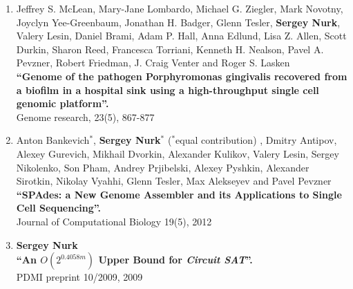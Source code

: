 \begin{enumerate}
\item Jeffrey S. McLean, Mary-Jane Lombardo, Michael G. Ziegler, Mark Novotny, Joyclyn Yee-Greenbaum, Jonathan H. Badger, Glenn Tesler, \textbf{Sergey Nurk}, Valery Lesin, Daniel Brami, Adam P. Hall, Anna Edlund, Lisa Z. Allen, Scott Durkin, Sharon Reed, Francesca Torriani, Kenneth H. Nealson, Pavel A. Pevzner, Robert Friedman, J. Craig Venter and Roger S. Lasken \\
\textbf{``Genome of the pathogen Porphyromonas gingivalis recovered from a biofilm in a hospital sink using a high-throughput single cell genomic platform''.} \\
Genome research, 23(5), 867-877

\item Anton Bankevich$^*$, \textbf{Sergey Nurk}$^*$ ($^*$equal contribution)%
, Dmitry Antipov, Alexey Gurevich, Mikhail Dvorkin, Alexander Kulikov, Valery Lesin, Sergey Nikolenko, Son Pham, Andrey Prjibelski, Alexey Pyshkin, Alexander Sirotkin, Nikolay Vyahhi, Glenn Tesler, Max Alekseyev and Pavel Pevzner \\
\textbf{``SPAdes: a New Genome Assembler and its Applications to Single Cell Sequencing''.}\\
Journal of Computational Biology 19(5), 2012

\item \textbf{Sergey Nurk} \\
\textbf{``An $O(2^{0.4058m})$ Upper Bound for \textit{Circuit SAT}''.}\\
PDMI preprint 10/2009, 2009
\end{enumerate}

